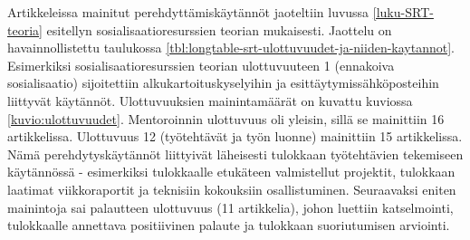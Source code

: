 \documentclass[utf8]{gradu3}
\begin{document}
Artikkeleissa mainitut perehdyttämiskäytännöt jaoteltiin luvussa \ref{luku-SRT-teoria} esitellyn sosialisaatioresurssien teorian mukaisesti. Jaottelu on havainnollistettu taulukossa \ref{tbl:longtable-srt-ulottuvuudet-ja-niiden-kaytannot}. Esimerkiksi sosialisaatioresurssien teorian ulottuvuuteen 1 (ennakoiva sosialisaatio) sijoitettiin alkukartoituskyselyihin ja esittäytymissähköposteihin liittyvät käytännöt. Ulottuvuuksien mainintamäärät on kuvattu kuviossa \ref{kuvio:ulottuvuudet}. Mentoroinnin ulottuvuus oli yleisin, sillä se mainittiin 16 artikkelissa. Ulottuvuus 12 (työtehtävät ja työn luonne) mainittiin 15 artikkelissa. Nämä perehdytyskäytännöt liittyivät läheisesti tulokkaan työtehtävien tekemiseen käytännössä - esimerkiksi tulokkaalle etukäteen valmistellut projektit, tulokkaan laatimat viikkoraportit ja teknisiin kokouksiin osallistuminen. Seuraavaksi eniten mainintoja sai palautteen ulottuvuus (11 artikkelia), johon luettiin katselmointi, tulokkaalle annettava positiivinen palaute ja tulokkaan suoriutumisen arviointi.
\end{document}
